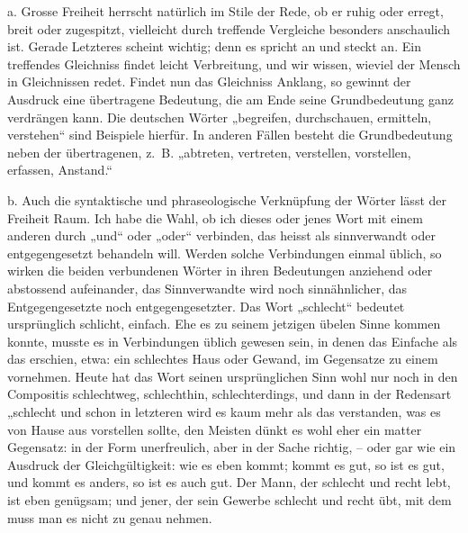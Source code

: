 {\label{III.II.II.12.2a}a. Grosse Freiheit herrscht natürlich im Stile der Rede, ob er ruhig oder erregt, breit oder zugespitzt, vielleicht durch treffende Vergleiche besonders anschaulich ist. Gerade Letzteres scheint wichtig; denn es spricht an und steckt an. Ein treffendes Gleichniss findet leicht Verbreitung, und wir wissen, wieviel der Mensch in Gleichnissen redet. Findet nun das Gleichniss Anklang, so gewinnt der Ausdruck eine übertragene Bedeutung, die am Ende seine Grundbedeutung ganz verdrängen kann. Die deutschen Wörter „begreifen, durchschauen, ermitteln, verstehen“ sind Beispiele hierfür. In anderen Fällen besteht die Grundbedeutung neben der übertragenen, z.~B. „abtreten, vertreten, verstellen, vorstellen, erfassen, Anstand.“

\label{III.II.II.12.2b}b. Auch die syntaktische und phraseologische Verknüpfung der Wörter lässt der Freiheit Raum. Ich habe die Wahl, ob ich dieses oder jenes Wort mit einem anderen durch „und“ oder „oder“ verbinden, das heisst als sinnverwandt oder entgegengesetzt behandeln will. Werden solche Verbindungen einmal üblich, so wirken die beiden verbundenen \label{fp.233} Wörter in ihren Bedeutungen anziehend oder abstossend aufeinander, das Sinnverwandte wird noch sinnähnlicher, das Entgegengesetzte noch entgegengesetzter. Das Wort „schlecht“ bedeutet ursprünglich schlicht, einfach. Ehe es zu seinem jetzigen übelen Sinne kommen konnte, musste es in Verbindungen üblich gewesen sein, in denen das \label{sp.235} Einfache als das  erschien, etwa: ein schlechtes Haus oder Gewand, im Gegensatze zu einem vornehmen. Heute hat das Wort seinen ursprünglichen Sinn wohl nur noch in den Compositis schlechtweg, schlechthin, schlechterdings, und dann in der Redensart „schlecht und  schon in  letzteren wird es kaum mehr als das verstanden, was es von Hause aus vorstellen sollte, den Meisten dünkt es wohl eher  ein matter Gegensatz: in der Form unerfreulich, aber in der Sache richtig, – oder gar wie ein Ausdruck der Gleichgültigkeit: wie es eben kommt; kommt es gut, so ist es gut, und kommt es anders, so ist es auch gut. Der Mann, der schlecht und recht lebt, ist eben genügsam; und jener, der sein Gewerbe schlecht und recht übt, mit dem muss man es nicht zu genau nehmen.

}
